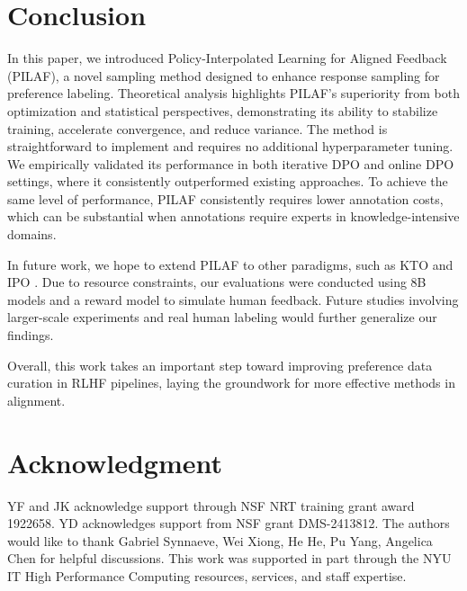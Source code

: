 \section{Conclusion}

In this paper, we introduced Policy-Interpolated Learning for Aligned Feedback (PILAF), a novel sampling method designed to enhance response sampling for preference labeling. Theoretical analysis highlights PILAF's superiority from both optimization and statistical perspectives, demonstrating its ability to stabilize training, accelerate convergence, and reduce variance. The method is straightforward to implement and requires no additional hyperparameter tuning. We empirically validated its performance in both iterative DPO and online DPO settings, where it consistently outperformed existing approaches. To achieve the same level of performance, PILAF consistently requires lower annotation costs, which can be substantial when annotations require experts in knowledge-intensive domains.

In future work, we hope to extend PILAF to other paradigms, such as KTO \citep{ethayarajh2024kto} and IPO \citep{azar2024general}. Due to resource constraints, our evaluations were conducted using 8B models and a reward model to simulate human feedback. Future studies involving larger-scale experiments and real human labeling would further generalize our findings.

Overall, this work takes an important step toward improving preference data curation in RLHF pipelines, laying the groundwork for more effective methods in alignment. 

\section*{Acknowledgment}

YF and JK acknowledge support through NSF NRT training grant award 1922658. 
YD acknowledges support from NSF grant
DMS-2413812.
The authors would like to thank Gabriel Synnaeve, Wei Xiong, He He, Pu Yang, Angelica Chen for helpful discussions.
This work was supported in part through the NYU IT High Performance Computing resources, services, and staff expertise.

